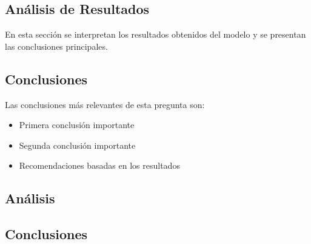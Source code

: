 \subsection*{Análisis de Resultados}
En esta sección se interpretan los resultados obtenidos del modelo y se presentan las conclusiones principales.

\subsection*{Conclusiones}
Las conclusiones más relevantes de esta pregunta son:
\begin{itemize}
    \item Primera conclusión importante
    \item Segunda conclusión importante
    \item Recomendaciones basadas en los resultados
\end{itemize}
\subsection*{Análisis}

\subsection*{Conclusiones}
